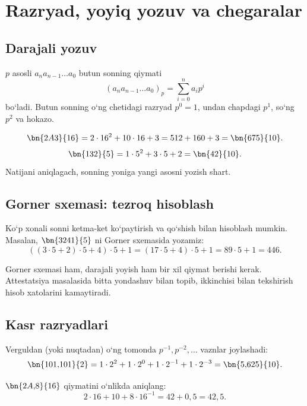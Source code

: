 \documentclass[11pt,a4paper,openany,oneside]{book}
\begin{document}
\chapter{Razryad, yoyiq yozuv va chegaralar}
\section{Darajali yozuv}
\begin{definition}
\(p\) asosli \(a_na_{n-1}\ldots a_0\) butun sonning qiymati
\[\boxed{(a_na_{n-1}\ldots a_0)_p=\sum_{i=0}^{n}a_ip^i}\]
bo‘ladi. Butun sonning o‘ng chetidagi razryad \(p^0=1\), undan chapdagi \(p^1\), so‘ng \(p^2\) va hokazo. 
\end{definition}
\begin{worked}
\[\bn{2A3}{16}=2\cdot16^2+10\cdot16+3=512+160+3=\bn{675}{10}.\]
\[\bn{132}{5}=1\cdot5^2+3\cdot5+2=\bn{42}{10}.\]
Natijani aniqlagach, sonning yoniga yangi asosni yozish shart.
\end{worked}
\section{Gorner sxemasi: tezroq hisoblash}
Ko‘p xonali sonni ketma-ket ko‘paytirish va qo‘shish bilan hisoblash mumkin. Masalan, \(\bn{3241}{5}\) ni Gorner sxemasida yozamiz:
\[((3\cdot5+2)\cdot5+4)\cdot5+1=(17\cdot5+4)\cdot5+1=89\cdot5+1=446.\]
\begin{important}
Gorner sxemasi ham, darajali yoyish ham bir xil qiymat berishi kerak. Attestatsiya masalasida bitta yondashuv bilan topib, ikkinchisi bilan tekshirish hisob xatolarini kamaytiradi.
\end{important}
\section{Kasr razryadlari}
Verguldan (yoki nuqtadan) o‘ng tomonda \(p^{-1},p^{-2},\ldots\) vaznlar joylashadi:
\[\bn{101{,}101}{2}=1\cdot2^2+1\cdot2^0+1\cdot2^{-1}+1\cdot2^{-3}=\bn{5{,}625}{10}.\]
\begin{worked}
\(\bn{2A{,}8}{16}\) qiymatini o‘nlikda aniqlang:
\[2\cdot16+10+8\cdot16^{-1}=42+0{,}5=42{,}5.\]
\end{worked}
\end{document}
